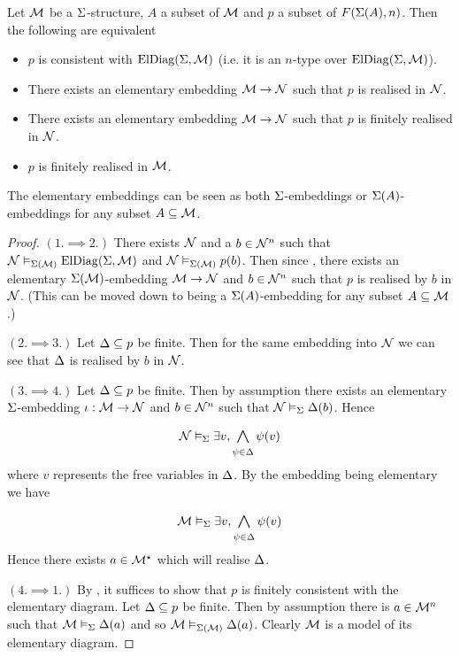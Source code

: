 \begin{lem}
    Let $\mathcal{M}$ be a $\Sigma$-structure, 
    $A$ a subset of ${\mathcal{M}}$ and $p$ a subset of $F(\Sigma(A),n)$.
    Then the following are equivalent 
    \begin{itemize}
        \item $p$ is consistent with $\mathrm{ElDiag}(\Sigma,\mathcal{M})$ 
            (i.e. it is an $n$-type over $\mathrm{ElDiag}(\Sigma,\mathcal{M})$).
        \item There exists an elementary embedding $\mathcal{M} \to \mathcal{N}$ 
            such that $p$ is realised in $\mathcal{N}$.
        \item There exists an elementary embedding $\mathcal{M} \to \mathcal{N}$ 
            such that $p$ is finitely realised in $\mathcal{N}$.
        \item $p$ is finitely realised in $\mathcal{M}$.
    \end{itemize}
    The elementary embeddings can be seen as both $\Sigma$-embeddings or 
    $\Sigma(A)$-embeddings for any subset $A \subseteq \mathcal{M}$.
\end{lem}
\begin{proof}
    $(1. \implies 2.)$ There exists $\mathcal{N}$ and a
    $b \in {\mathcal{N}}^n$ such that 
    $\mathcal{N} \vDash_{\Sigma(\mathcal{M})} \mathrm{ElDiag}(\Sigma,\mathcal{M})$ and 
    $\mathcal{N} \vDash_{\Sigma(\mathcal{M})} p(b)$.
    Then since , 
    there exists an elementary $\Sigma(\mathcal{M})$-embedding $\mathcal{M} \to \mathcal{N}$ 
    and $b \in {\mathcal{N}}^n$ such that $p$ 
    is realised by $b$ in $\mathcal{N}$.
    (This can be moved down to being a $\Sigma(A)$-embedding for any 
    subset $A \subseteq \mathcal{M}$.)

    $(2. \implies 3.)$ Let $\Delta \subseteq p$ be finite.
    Then for the same embedding into $\mathcal{N}$ we can see that $\Delta$ 
    is realised by $b$ in $\mathcal{N}$.

    $(3. \implies 4.)$ Let $\Delta \subseteq p$ be finite.
    Then by assumption there exists an elementary $\Sigma$-embedding 
    $\iota : \mathcal{M} \to \mathcal{N}$ and $b \in {\mathcal{N}}^n$ 
    such that  
    $\mathcal{N} \vDash_{\Sigma} \Delta(b)$. 
    Hence 
    \[\NN \modelsi \exists v, \bigand{\psi \in \De}{} \psi(v)\]
    where $v$ represents the free variables in $\Delta$.
    By the embedding being elementary we have 
    \[\MM \modelsi \exists v, \bigand{\psi \in \De}{} \psi(v)\]
    Hence there exists $a \in \mathcal{M}^\star$ which will realise $\Delta$.

    $(4. \implies 1.)$
        By ,
        it suffices to show that $p$ 
        is finitely consistent with the elementary diagram.
        Let $\Delta \subseteq p$ be finite.
        Then by assumption there is $a \in {\mathcal{M}}^n$ such that 
        $\mathcal{M} \vDash_{\Sigma} \Delta(a)$ and so $\mathcal{M} \vDash_{\Sigma(\mathcal{M})} \Delta(a)$.
        Clearly $\mathcal{M}$ is a model of its elementary diagram.
\end{proof}

